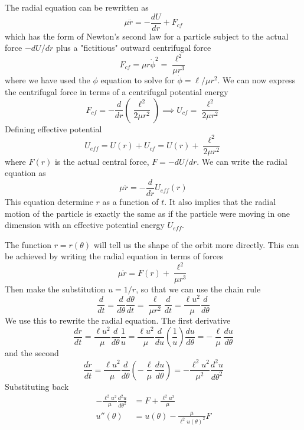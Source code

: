 \documentclass[../../../main.tex]{subfiles}
\begin{document}
The radial equation can be rewritten as
\begin{equation*}
    \mu \ddot{r}=-\frac{dU }{dr }+F_{cf}
\end{equation*}
which has the form of Newton's second law for a particle subject to the actual force $-dU /dr$ plus a "fictitious" outward centrifugal force
\begin{equation*}
    F_{cf}=\mu r \dot{\phi}^2=\frac{\ell^2 }{\mu r^3}
\end{equation*}
where we have used the $\phi$ equation to solve for $\dot{\phi}={\ell }/{\mu r^2}$.
We can now express the centrifugal force in terms of a centrifugal potential energy
\begin{equation*}
    F_{cf}=-\frac{d }{dr }\left( \frac{\ell^2 }{2\mu r^2} \right)
    \implies
    U_{cf}=\frac{\ell^2 }{2 \mu r^2}
\end{equation*}
Defining effective potential
\begin{equation*}
    U_{eff}=U(r)+U_{cf}=U(r)+\frac{\ell^2 }{2\mu r^2}
\end{equation*}
where $F(r)$ is the actual central force, $F = -dU/dr$.
We can write the radial equation as
\begin{equation*}
    \mu \ddot{r}=-\frac{d }{dr }U_{eff}(r)
\end{equation*}
This equation determine $r$ as a function of $t$.
It also implies that the radial motion of the particle is exactly the same as if the particle were moving in one dimension with an effective potential energy $U_{eff}$.

The function $r = r (\theta)$ will tell us the shape of the orbit more directly.
This can be achieved by writing the radial equation in terms of forces
\begin{equation*}
    \mu \ddot{r}=F(r)+\frac{\ell^2 }{\mu r^3}
\end{equation*}
Then make the substitution $u=1/r$, so that we can use the chain rule
\begin{equation*}
    \frac{d }{dt}=
    \frac{d }{d\theta}\frac{d\theta }{dt}=
    \frac{\ell}{\mu r^2}\frac{d }{dt}=
    \frac{\ell u^2}{\mu}\frac{d   }{d\theta}
\end{equation*}
We use this to rewrite the radial equation.
The first derivative
\begin{equation*}
    \frac{dr }{dt}=
    \frac{\ell u^2}{\mu}\frac{d   }{d\theta}\frac{1 }{u}=
    \frac{\ell u^2}{\mu}\frac{d   }{du}\left(\frac{1 }{u}\right)\frac{du }{d\theta}=
    -\frac{\ell }{\mu}\frac{du }{d\theta}
\end{equation*}
and the second
\begin{equation*}
    \frac{d \dot{r}}{dt}=
    \frac{\ell u^2}{\mu}\frac{d   }{d\theta}\left(     -\frac{\ell }{\mu}\frac{du }{d\theta} \right)=
    -\frac{\ell^2u^2 }{\mu^2}\frac{d^2u }{d\theta^2}
\end{equation*}
Substituting back
\begin{align*}
    -\frac{\ell^2u^2 }{\mu}\frac{d^2u }{d\theta^2} & = F+ \frac{\ell^2u^3 }{\mu}                   \\
    u''(\theta)                                    & =  u(\theta)-\frac{\mu }{\ell^2 u(\theta)^2}F
\end{align*}
\end{document}
